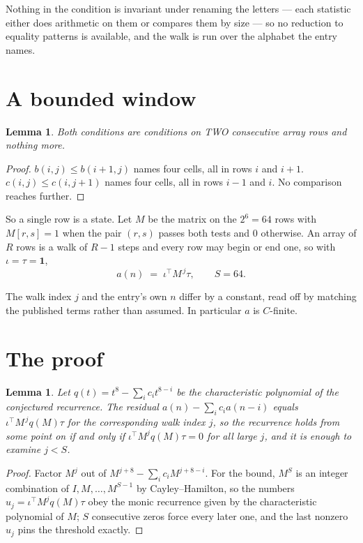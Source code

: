 \documentclass[11pt,a4paper]{article}
\theoremstyle{plain}
\newtheorem{lemma}[theorem]{Lemma}
\theoremstyle{definition}
\begin{document}
Nothing in the condition is invariant under renaming the letters --- each statistic either does
arithmetic on them or compares them by size --- so no reduction to equality patterns is
available, and the walk is run over the alphabet the entry names.

\section{A bounded window}

\begin{lemma}\label{lem:win}
Both conditions are conditions on TWO consecutive array rows and nothing more.
\end{lemma}

\begin{proof}
$b(i,j)\le b(i{+}1,j)$ names four cells, all in rows $i$ and $i+1$. $c(i,j)\le c(i,j{+}1)$
names four cells, all in rows $i-1$ and $i$. No comparison reaches further.
\end{proof}

So a single row is a state. Let $M$ be the matrix on the $2^{6}=64$ rows with
$M[r,s]=1$ when the pair $(r,s)$ passes both tests and $0$ otherwise. An array of $R$ rows is a
walk of $R-1$ steps and every row may begin or end one, so with $\iota=\tau=\mathbf{1}$,
\[
a(n)\;=\;\iota^{\!\top}M^{\,j}\tau ,\qquad S=64.
\]

The walk index $j$ and the entry's own $n$ differ by a constant, read off by matching the
published terms rather than assumed. In particular $a$ is $C$-finite.

\section{The proof}

\begin{lemma}\label{lem:crit}
Let $q(t)=t^{8}-\sum_i c_it^{8-i}$ be the characteristic polynomial of the
conjectured recurrence. The residual $a(n)-\sum_ic_ia(n-i)$ equals
$\iota^{\!\top}M^{\,j}q(M)\tau$ for the corresponding walk index $j$, so the recurrence
holds from some point on if and only if $\iota^{\!\top}M^{j}q(M)\tau=0$ for all large $j$,
and it is enough to examine $j<S$.
\end{lemma}

\begin{proof}
Factor $M^{j}$ out of $M^{j+8}-\sum_ic_iM^{j+8-i}$. For the bound, $M^{S}$
is an integer combination of $I,M,\dots,M^{S-1}$ by Cayley--Hamilton, so the numbers
$u_j=\iota^{\!\top}M^{j}q(M)\tau$ obey the monic recurrence given by the characteristic
polynomial of $M$; $S$ consecutive zeros force every later one, and the last nonzero $u_j$
pins the threshold exactly.
\end{proof}
\end{document}
